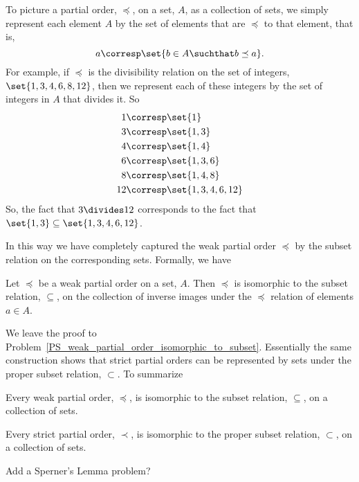 To picture a partial order, $\preceq$, on a set, $A$, as a collection of
sets, we simply represent each element $A$ by the set of elements
that are $\preceq$ to that element, that is,
\[
a \corresp \set{b \in A \suchthat b \preceq a}.
\]
For example, if $\preceq$ is the divisibility relation on the set of
integers, $\set{1,3,4,6,8,12}$, then we represent each of these integers
by the set of integers in $A$ that divides it.  So
\begin{align*}
1 & \corresp \set{1}\\
3 & \corresp \set{1,3}\\
4 & \corresp \set{1,4}\\
6 & \corresp \set{1,3,6}\\
8 & \corresp \set{1,4,8}\\
12 & \corresp \set{1,3,4,6, 12}
\end{align*}
So, the fact that $3 \divides 12$ corresponds to the fact that $\set{1,3}
\subseteq \set{1,3,4,6, 12}$.

In this way we have completely captured the weak partial order $\preceq$ by the
subset relation on the corresponding sets.  Formally, we have
\begin{lemma}\label{rgb}
  Let $\preceq$ be a weak partial order on a set, $A$.  Then $\preceq$
  is isomorphic to the subset relation, $\subseteq$, on the collection
  of inverse images under the $\preceq$ relation of elements $a \in
  A$.
\end{lemma}
We leave the proof to
Problem~\ref{PS_weak_partial_order_isomorphic_to_subset}.  Essentially
the same construction shows that strict partial orders can be
represented by sets under the proper subset relation, $\subset$.
To summarize
\begin{theorem}
  Every weak partial order, $\preceq$, is isomorphic to the subset
  relation, $\subseteq$, on a collection of sets.

  Every strict partial order, $\prec$, is isomorphic to the proper
  subset relation, $\subset$, on a collection of sets.
\end{theorem}

\begin{problems}
\classproblems
{}

\homeworkproblems
{}

\begin{editingnotes}
Add a Sperner's Lemma problem?
\end{editingnotes}

\end{problems}


